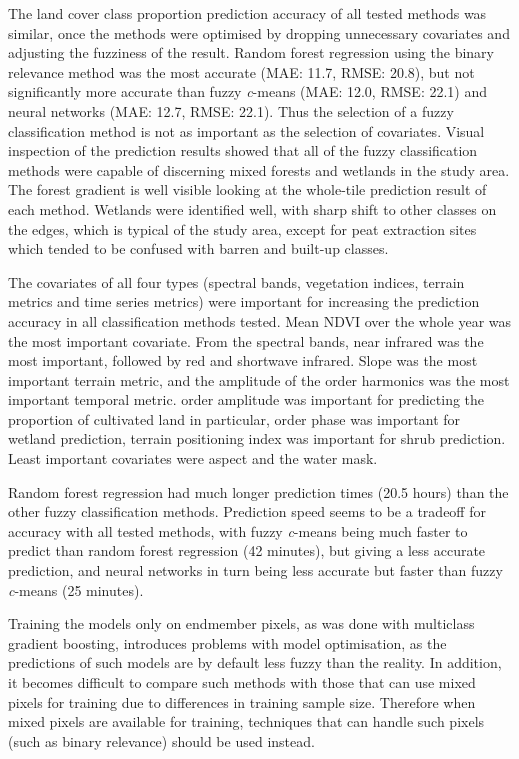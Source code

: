 \documentclass[a4paper,12pt]{scrbook}
\begin{document}
The land cover class proportion prediction accuracy of all tested methods was similar, once the methods were optimised by dropping unnecessary covariates and adjusting the fuzziness of the result. Random forest regression using the binary relevance method was the most accurate (MAE: 11.7, RMSE: 20.8), but not significantly more accurate than fuzzy \textit{c}-means (MAE: 12.0, RMSE: 22.1) and neural networks (MAE: 12.7, RMSE: 22.1). Thus the selection of a fuzzy classification method is not as important as the selection of covariates. Visual inspection of the prediction results showed that all of the fuzzy classification methods were capable of discerning mixed forests and wetlands in the study area. The forest gradient is well visible looking at the whole-tile prediction result of each method. Wetlands were identified well, with sharp shift to other classes on the edges, which is typical of the study area, except for peat extraction sites which tended to be confused with barren and built-up classes.

The covariates of all four types (spectral bands, vegetation indices, terrain metrics and time series metrics) were important for increasing the prediction accuracy in all classification methods tested. Mean NDVI over the whole year was the most important covariate. From the spectral bands, near infrared was the most important, followed by red and shortwave infrared. Slope was the most important terrain metric, and the amplitude of the  order harmonics was the most important temporal metric.  order amplitude was important for predicting the proportion of cultivated land in particular,  order phase was important for wetland prediction, terrain positioning index was important for shrub prediction. Least important covariates were aspect and  the water mask.

Random forest regression had much longer prediction times (20.5 hours) than the other fuzzy classification methods. Prediction speed seems to be a tradeoff for accuracy with all tested methods, with fuzzy \textit{c}-means being much faster to predict than random forest regression (42 minutes), but giving a less accurate prediction, and neural networks in turn being less accurate but faster than fuzzy \textit{c}-means (25 minutes).


Training the models only on endmember pixels, as was done with multiclass gradient boosting, introduces problems with model optimisation, as the predictions of such models are by default less fuzzy than the reality. In addition, it becomes difficult to compare such methods with those that can use mixed pixels for training due to differences in training sample size. Therefore when mixed pixels are available for training, techniques that can handle such pixels (such as binary relevance) should be used instead.
\end{document}

